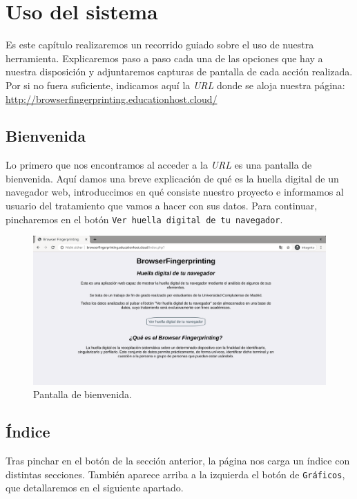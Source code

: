 \chapter{Uso del sistema}
Es este capítulo realizaremos un recorrido guiado sobre el uso de nuestra herramienta. Explicaremos paso a paso cada una de las opciones que hay a nuestra disposición y adjuntaremos capturas de pantalla de cada acción realizada. Por si no fuera suficiente, indicamos aquí la \textit{URL} donde se aloja nuestra página: \url{http://browserfingerprinting.educationhost.cloud/}

\section{Bienvenida}

Lo primero que nos encontramos al acceder a la \textit{URL} es una pantalla de bienvenida. Aquí damos una breve explicación de qué es la huella digital de un navegador web, introduccimos en qué consiste nuestro proyecto e informamos al usuario del tratamiento que vamos a hacer con sus datos. Para continuar, pincharemos en el botón \texttt{Ver huella digital de tu navegador}.

\begin{figure}[H]
	\centering
	\includegraphics[width=1\textwidth]{Images/wellcome.png}
	\caption{Pantalla de bienvenida.}
	\label{fig:wellcome}
\end{figure}

\section{Índice}

Tras pinchar en el botón de la sección anterior, la página nos carga un índice con distintas secciones. También aparece arriba a la izquierda el botón de \texttt{Gráficos}, que detallaremos en el siguiente apartado.


